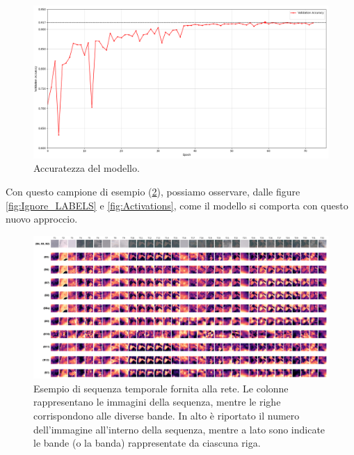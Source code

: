 \begin{figure}[H]
    \centering
    \includegraphics[width=1.02\textwidth]{Immagini/sperimentazione/UNet3D_Weight_Ignore_accuracy_edited_v2.png}
    \caption{Accuratezza del modello.}
    \label{fig:UNET_3D_withWeights_Ignore_accuracy}
\end{figure}


Con questo campione di esempio (\ref{fig:Ignore_INPUT}), possiamo osservare,  
dalle figure \ref{fig:Ignore_LABELS} e \ref{fig:Activations}, come il modello si 
comporta con questo nuovo approccio.
\begin{figure}[H]
    \centering
    \includegraphics[width=1.05\textwidth]{Immagini/sperimentazione/INPUT_Ignore_Edit.png}
    \caption{Esempio di sequenza temporale fornita alla rete. Le colonne rappresentano le 
    immagini della sequenza, mentre le righe corrispondono alle diverse bande. In alto è 
    riportato il numero dell'immagine all'interno della sequenza, mentre a lato sono 
    indicate le bande (o la banda) rappresentate da ciascuna riga.}
    \label{fig:Ignore_INPUT}
\end{figure}


